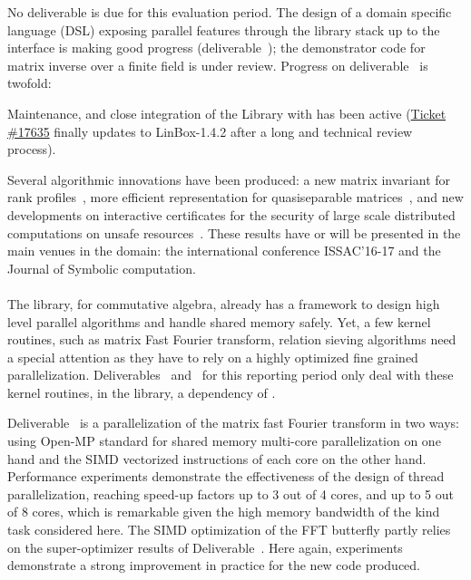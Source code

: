 \documentclass{deliverablereport}
\begin{document}
No deliverable is due for this evaluation period. The design of a
domain specific language (DSL) exposing parallel features through the
library stack up to the \Sage interface is making good progress
(deliverable~); the demonstrator code
for matrix inverse over a finite field is under review.
%
Progress on deliverable~ is twofold:
\begin{compactitem}
\item Maintenance, and close integration of the Library with \Sage has been
active (\href{https://trac.sagemath.org/ticket/17635}{Ticket \#17635} finally
updates \Sage to LinBox-1.4.2 after a long and technical review process).
\item Several algorithmic innovations have been produced: a new matrix invariant
  for rank profiles~\cite{DumPerSul:fcrpmgbd16}, more efficient
  representation for quasiseparable matrices~\cite{Pernet:cqm16,PerSto:tsegqm17}, and new developments on
  interactive certificates for the security of large scale distributed
  computations on unsafe
  resources~\cite{DumKalTho:lticmpdsm16,DumLucPer:cftearp17}. These results have or will
  be presented in the main venues in the domain:
  the international conference ISSAC'16-17 and the Journal of Symbolic computation.
\end{compactitem}

  \paragraph{}

  The \Singular library, for commutative algebra, already has a framework to
  design high level parallel algorithms and handle shared memory safely.
  Yet, a few kernel routines, such as matrix Fast Fourier
  transform, relation  sieving algorithms need a special attention as they have
  to rely on a highly optimized fine grained
  parallelization. Deliverables~
  and~ for this reporting period only deal with these
  kernel routines, in the \FLINT library, a dependency of \Singular.

  Deliverable~ is a parallelization of the matrix fast
  Fourier transform in two ways: using Open-MP standard for shared memory
  multi-core parallelization on one hand and the SIMD vectorized instructions of
  each core on the other hand. Performance experiments demonstrate the
  effectiveness of the design of thread parallelization, reaching speed-up
  factors up to 3 out of 4 cores, and up to 5 out of 8 cores, which is remarkable given
  the high memory bandwidth of the kind task considered here. The SIMD
  optimization of the FFT butterfly partly relies on the super-optimizer results
  of Deliverable~. Here again, experiments
  demonstrate a strong improvement in practice for the new code produced.
\end{document}
